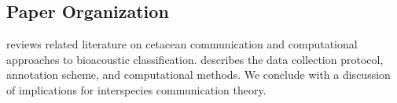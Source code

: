 \subsection{Paper Organization}
\label{subsec:organization}

 reviews related literature on cetacean communication and computational approaches to bioacoustic classification.
 describes the data collection protocol, annotation scheme, and computational methods.
We conclude with a discussion of implications for interspecies communication theory.
